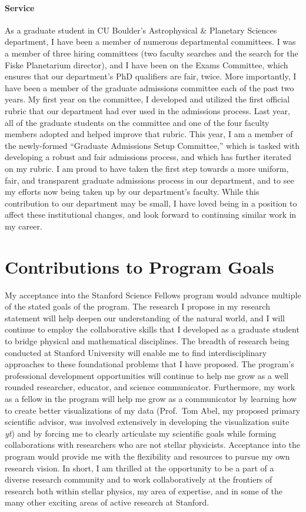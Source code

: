 \documentclass[aps, pre, onecolumn, nofootinbib, notitlepage, groupedaddress, amsfonts, amssymb, amsmath]{revtex4-1}
\begin{document}
\paragraph*{Service}
As a graduate student in CU Boulder's Astrophysical \& Planetary Sciences department, I have been a member of numerous departmental committees.
I was a member of three hiring committees (two faculty searches and the search for the Fiske Planetarium director), and I have been on the Exams Committee, which ensures that our department's PhD qualifiers are fair, twice.
More importantly, I have been a member of the graduate admissions committee each of the past two years.
My first year on the committee, I developed and utilized the first official rubric that our department had ever used in the admissions process.
Last year, all of the graduate students on the committee and one of the four faculty members adopted and helped improve that rubric.
This year, I am a member of the newly-formed ``Graduate Admissions Setup Committee,'' which is tasked with developing a robust and fair admissions process, and which has further iterated on my rubric.
I am proud to have taken the first step towards a more uniform, fair, and transparent graduate admissions process in our department, and to see my efforts now being taken up by our department's faculty.
While this contribution to our department may be small, I have loved being in a position to affect these institutional changes, and look forward to continuing similar work in my career.


\section*{Contributions to Program Goals}
\vspace{-12pt}

My acceptance into the Stanford Science Fellows program would advance multiple of the stated goals of the program.
The research I propose in my research statement will help deepen our understanding of the natural world, and I will continue to employ the collaborative skills that I developed as a graduate student to bridge physical and mathematical disciplines.
The breadth of research being conducted at Stanford University will enable me to find interdisciplinary approaches to these foundational problems that I have proposed.
The program's professional development opportunities will continue to help me grow as a well rounded researcher, educator, and science communicator.
Furthermore, my work as a fellow in the program will help me grow as a communicator by learning how to create better visualizations of my data (Prof.~Tom Abel, my proposed primary scientific advisor, was involved extensively in developing the visualization suite \emph{yt}) and by forcing me to clearly articulate my scientific goals while forming collaborations with researchers who are not stellar physicists. 
Acceptance into the program would provide me with the flexibility and resources to pursue my own research vision.
In short, I am thrilled at the opportunity to be a part of a diverse research community and to work collaboratively at the frontiers of research both within stellar physics, my area of expertise, and in some of the many other exciting areas of active research at Stanford.



\end{document}
